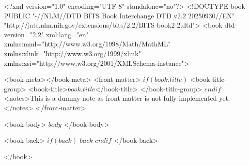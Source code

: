 <?xml version="1.0" encoding="UTF-8" standalone="no"?>
<!DOCTYPE book PUBLIC "-//NLM//DTD BITS Book Interchange DTD v2.2 20250930//EN" "http://jats.nlm.nih.gov/extensions/bits/2.2/BITS-book2-2.dtd">
<book
dtd-version="2.2" xml:lang="en" 
xmlns:mml="http://www.w3.org/1998/Math/MathML" 
xmlns:xlink="http://www.w3.org/1999/xlink" 
xmlns:xsi="http://www.w3.org/2001/XMLSchema-instance">

<book-meta></book-meta>
<front-matter>
$if(book.title)$
<book-title-group>
    <book-title>$book.title$</book-title>
</book-title-group>
$endif$
<notes>This is a dummy note as front matter is not fully implemented yet.</notes>
</front-matter>

<book-body>
$body$
</book-body>

<book-back>
$if(back)$
$back$
$endif$
</book-back>

</book>